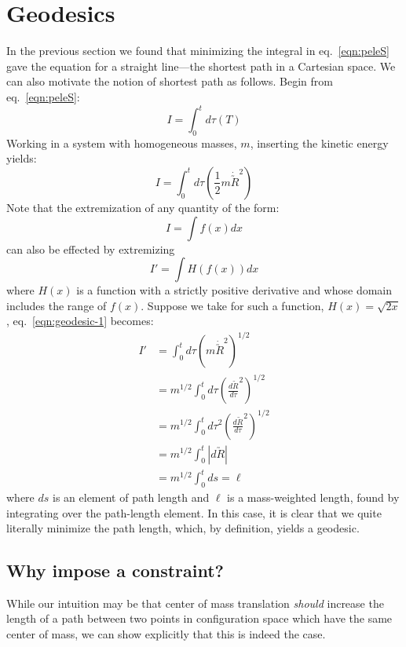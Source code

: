 \documentclass[letter,11pt]{article}
\newcommand{\cvec}[1]{\utilde{#1}}
\newcommand{\laeq}[1]{\label{eqn:#1}}
\newcommand{\refeq}[1]{eq.~\ref{eqn:#1}}
\begin{document}
\section{Geodesics}
In the previous section we found that minimizing the integral in \refeq{peleS} gave the equation for a straight line---the shortest path in a Cartesian space. We can also motivate the notion of shortest path as follows. Begin from \refeq{peleS}:
\[
    I = \int_{0}^{t}d\tau\left( T \right)
\]
Working in a system with homogeneous masses, $m$, inserting the kinetic energy yields:
\begin{equation}\laeq{geodesic-1}
  I = \int_{0}^{t}d\tau\left( \frac{1}{2}m {\dot{\cvec{R}}}^2\right)
\end{equation}
Note that the extremization of any quantity of the form:
\begin{equation}
  I = \int f(x)dx
\end{equation}
can also be effected by extremizing 
\begin{equation}
  I' = \int H(f(x))dx
\end{equation}
where $H(x)$ is a function with a strictly positive derivative and  whose domain includes the range of $f(x)$. Suppose we take for such a function, $H(x)=\sqrt{2x}$, \refeq{geodesic-1} becomes:
\begin{align}
  I' &= \int_{0}^{t}d\tau {\left(m {\dot{\cvec{R}}}^2\right)}^{1/2} \\
  &= m^{1/2} \int_{0}^{t}d\tau {\left({\frac{d \cvec{R} }{d\tau}}^2\right)}^{1/2} \\
  &= m^{1/2} \int_{0}^{t} {d\tau^2 \left({\frac{d \cvec{R} }{d\tau}}^2\right)}^{1/2} \\
  &= m^{1/2} \int_{0}^{t} \left| d \cvec{R} \right| \\
  &= m^{1/2} \int_{0}^{t} ds = \ell
\end{align}
where $ds$ is an element of path length and $\ell$ is a mass-weighted length, found by integrating over the path-length element. In this case, it is clear that we quite literally minimize the path length, which, by definition, yields a geodesic.


\subsection{Why impose a constraint?}
While our intuition may be that center of mass translation \emph{should} increase the length of a path between two points in configuration space which have the same center of mass, we can show explicitly that this is indeed the case.
\end{document}
